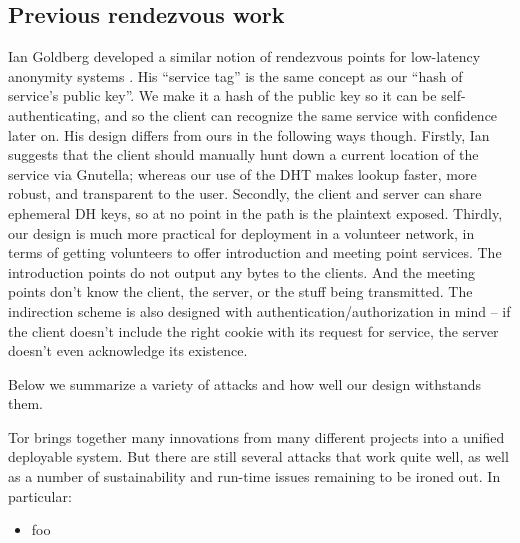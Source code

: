 \documentclass[times,10pt,twocolumn]{article}
\begin{document}
\subsection{Previous rendezvous work}

Ian Goldberg developed a similar notion of rendezvous points for
low-latency anonymity systems \cite{ian-thesis}. His ``service tag''
is the same concept as our ``hash of service's public key''. We make it
a hash of the public key so it can be self-authenticating, and so the
client can recognize the same service with confidence later on. His
design differs from ours in the following ways though. Firstly, Ian
suggests that the client should manually hunt down a current location of
the service via Gnutella; whereas our use of the DHT makes lookup faster,
more robust, and transparent to the user. Secondly, the client and server
can share ephemeral DH keys, so at no point in the path is the plaintext
exposed. Thirdly, our design is much more practical for deployment in a
volunteer network, in terms of getting volunteers to offer introduction
and meeting point services. The introduction points do not output any
bytes to the clients. And the meeting points don't know the client,
the server, or the stuff being transmitted. The indirection scheme
is also designed with authentication/authorization in mind -- if the
client doesn't include the right cookie with its request for service,
the server doesn't even acknowledge its existence.

\label{sec:maintaining-anonymity}

\label{subsec:many-messages}


\label{sec:attacks}

Below we summarize a variety of attacks and how well our design withstands
them.


\label{sec:conclusion}

Tor brings together many innovations from many different projects into
a unified deployable system. But there are still several attacks that
work quite well, as well as a number of sustainability and run-time
issues remaining to be ironed out. In particular:

\begin{itemize}
\item foo
\end{itemize}






\end{document}
